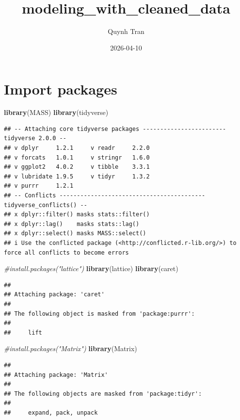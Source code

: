 \documentclass[
]{article}
\title{modeling\_with\_cleaned\_data}
\author{Quynh Tran}
\date{2026-04-10}
\newenvironment{Shaded}{\begin{snugshade}}{\end{snugshade}}
\newcommand{\CommentTok}[1]{\textcolor[rgb]{0.56,0.35,0.01}{\textit{#1}}}
\newcommand{\FunctionTok}[1]{\textcolor[rgb]{0.13,0.29,0.53}{\textbf{#1}}}
\newcommand{\NormalTok}[1]{#1}
\begin{document}
\maketitle

\section{Import packages}\label{import-packages}

\begin{Shaded}
\begin{Highlighting}[]
\FunctionTok{library}\NormalTok{(MASS)}
\FunctionTok{library}\NormalTok{(tidyverse)}
\end{Highlighting}
\end{Shaded}

\begin{verbatim}
## -- Attaching core tidyverse packages ------------------------ tidyverse 2.0.0 --
## v dplyr     1.2.1     v readr     2.2.0
## v forcats   1.0.1     v stringr   1.6.0
## v ggplot2   4.0.2     v tibble    3.3.1
## v lubridate 1.9.5     v tidyr     1.3.2
## v purrr     1.2.1     
## -- Conflicts ------------------------------------------ tidyverse_conflicts() --
## x dplyr::filter() masks stats::filter()
## x dplyr::lag()    masks stats::lag()
## x dplyr::select() masks MASS::select()
## i Use the conflicted package (<http://conflicted.r-lib.org/>) to force all conflicts to become errors
\end{verbatim}

\begin{Shaded}
\begin{Highlighting}[]
\CommentTok{\#install.packages("lattice")}
\FunctionTok{library}\NormalTok{(lattice)}
\FunctionTok{library}\NormalTok{(caret)}
\end{Highlighting}
\end{Shaded}

\begin{verbatim}
## 
## Attaching package: 'caret'
## 
## The following object is masked from 'package:purrr':
## 
##     lift
\end{verbatim}

\begin{Shaded}
\begin{Highlighting}[]
\CommentTok{\#install.packages("Matrix")}
\FunctionTok{library}\NormalTok{(Matrix)}
\end{Highlighting}
\end{Shaded}

\begin{verbatim}
## 
## Attaching package: 'Matrix'
## 
## The following objects are masked from 'package:tidyr':
## 
##     expand, pack, unpack
\end{verbatim}
\end{document}
